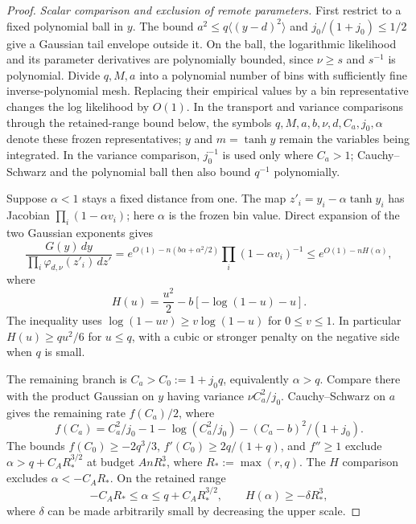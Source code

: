 \begin{proof}
\par\smallskip\noindent\textit{Scalar comparison and exclusion of remote parameters.}\enspace
First restrict to a fixed polynomial ball in $y$. The bound
$a^2\le q\langle(y-d)^2\rangle$ and $j_0/(1+j_0)\le1/2$ give a
Gaussian tail envelope outside it. On the ball, the logarithmic
likelihood and its parameter derivatives are polynomially bounded,
since $\nu\ge s$ and $s^{-1}$ is polynomial. Divide $q,M,a$ into a
polynomial number of bins with sufficiently fine inverse-polynomial
mesh. Replacing their empirical values by a bin representative changes
the log likelihood by $O(1)$. In the transport and variance comparisons
through the retained-range bound below, the symbols
$q,M,a,b,\nu,d,C_a,j_0,\alpha$ denote these frozen representatives;
$y$ and $m=\tanh y$ remain the variables being integrated. In the
variance comparison, $j_0^{-1}$ is used only where $C_a>1$; Cauchy--Schwarz
and the polynomial ball then also bound $q^{-1}$ polynomially.

Suppose $\alpha<1$ stays a fixed distance from one. The map
$z'_i=y_i-\alpha\tanh y_i$ has Jacobian
$\prod_i(1-\alpha v_i)$; here $\alpha$ is the frozen bin value.
Direct expansion of the two Gaussian exponents gives
\[
 \frac{G(y)\,dy}{\prod_i\varphi_{d,\nu}(z'_i)\,dz'}
 =e^{O(1)-n(b\alpha+\alpha^2/2)}
       \prod_i(1-\alpha v_i)^{-1}
 \le e^{O(1)-nH(\alpha)},
\]
where
\[
 H(u)=\frac{u^2}{2}-b[-\log(1-u)-u].
\]
The inequality uses $\log(1-uv)\ge v\log(1-u)$ for $0\le v\le1$.
In particular $H(u)\ge qu^2/6$ for $u\le q$, with a cubic or stronger
penalty on the negative side when $q$ is small.

The remaining branch is $C_a>C_0:=1+j_0q$, equivalently $\alpha>q$.
Compare there with the product Gaussian on $y$ having variance
$\nu C_a^2/j_0$. Cauchy--Schwarz on $a$ gives the remaining rate
$f(C_a)/2$, where
\[
 f(C_a)=C_a^2/j_0-1-\log(C_a^2/j_0)
               -(C_a-b)^2/(1+j_0).
\]
The bounds
$f(C_0)\ge-2q^3/3$, $f'(C_0)\ge2q/(1+q)$, and $f''\ge1$
exclude $\alpha>q+C_AR_*^{3/2}$ at budget $AnR_*^3$, where
$R_*:=\max(r,q)$. The $H$ comparison excludes
$\alpha<-C_AR_*$. On the retained range
\[
 -C_AR_*\le\alpha\le q+C_AR_*^{3/2},\qquad
 H(\alpha)\ge-\delta R_*^3,
\]
where $\delta$ can be made arbitrarily small by decreasing the upper
scale.


\end{proof}
